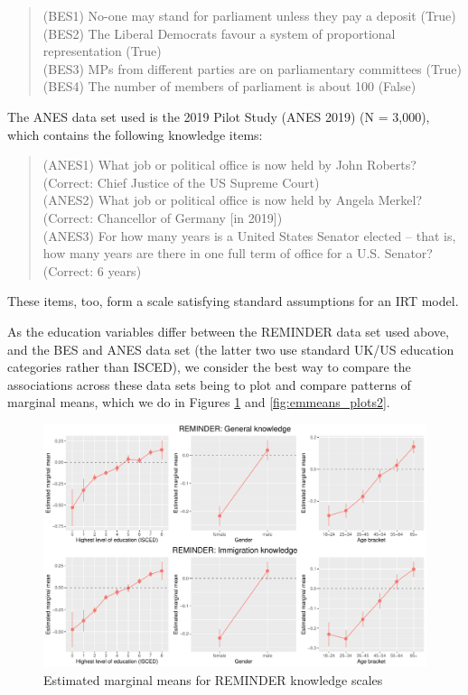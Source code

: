 \documentclass[11pt,halfline,a4paper,]{ouparticle}
\begin{document}
\begin{quote}
(BES1) No-one may stand for parliament unless they pay a deposit
(True)\\
(BES2) The Liberal Democrats favour a system of proportional
representation (True)\\
(BES3) MPs from different parties are on parliamentary committees
(True)\\
(BES4) The number of members of parliament is about 100 (False)
\end{quote}

The ANES data set used is the 2019 Pilot Study (ANES 2019) (N = 3,000),
which contains the following knowledge items:

\begin{quote}
(ANES1) What job or political office is now held by John Roberts?
(Correct: Chief Justice of the US Supreme Court)\\
(ANES2) What job or political office is now held by Angela Merkel?
(Correct: Chancellor of Germany {[}in 2019{]})\\
(ANES3) For how many years is a United States Senator elected -- that
is, how many years are there in one full term of office for a U.S.
Senator? (Correct: 6 years)
\end{quote}

These items, too, form a scale satisfying standard assumptions for an
IRT model.

As the education variables differ between the REMINDER data set used
above, and the BES and ANES data set (the latter two use standard UK/US
education categories rather than ISCED), we consider the best way to
compare the associations across these data sets being to plot and
compare patterns of marginal means, which we do in Figures
\ref{fig:emmeans_plots1} and \ref{fig:emmeans_plots2}.

\begin{figure}[!h]
\includegraphics[width=1\linewidth]{Revisiting-the-Measurement-and-Dimensionality-of-Political-Knowledge--Evidence-from-Seven-European-Countries_files/figure-latex/emmeans_plots1-1} \caption{Estimated marginal means for REMINDER knowledge scales}\label{fig:emmeans_plots1}
\end{figure}
\end{document}
